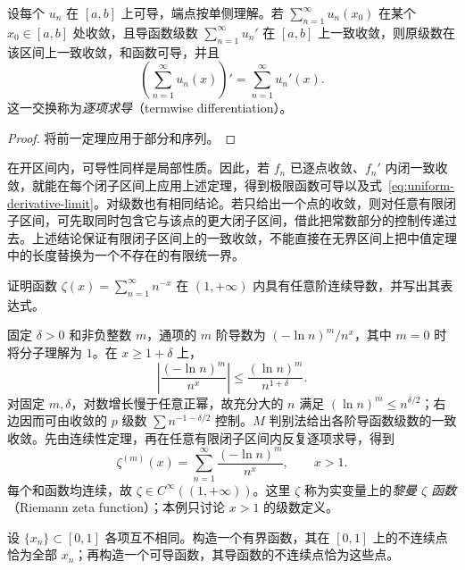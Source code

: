 \documentclass[UTF8,12pt,a4paper,fontset=fandol]{ctexbook}
\begin{document}
\begin{corollary}[逐项求导]
\label{cor:termwise-differentiation-uniform-derivative-series}
设每个 $u_n$ 在 $[a,b]$ 上可导，端点按单侧理解。若 $\sum_{n=1}^\infty u_n(x_0)$ 在某个 $x_0\in[a,b]$ 处收敛，且导函数级数 $\sum_{n=1}^\infty u_n'$ 在 $[a,b]$ 上一致收敛，则原级数在该区间上一致收敛，和函数可导，并且
\begin{equation}
    \left(\sum_{n=1}^\infty u_n(x)\right)'
       =\sum_{n=1}^\infty u_n'(x).
    \label{eq:termwise-differentiation-function-series}
\end{equation}
这一交换称为\emph{逐项求导}（termwise differentiation）。
\end{corollary}

\begin{proof}
将前一定理应用于部分和序列。
\end{proof}

在开区间内，可导性同样是局部性质。因此，若 $f_n$ 已逐点收敛、$f_n'$ 内闭一致收敛，就能在每个闭子区间上应用上述定理，得到极限函数可导以及式~\eqref{eq:uniform-derivative-limit}。对级数也有相同结论。若只给出一个点的收敛，则对任意有限闭子区间，可先取同时包含它与该点的更大闭子区间，借此把常数部分的控制传递过去。上述结论保证有限闭子区间上的一致收敛，不能直接在无界区间上把中值定理中的长度替换为一个不存在的有限统一界。

\begin{example}
\label{ex:zeta-function-smoothness-by-series}
证明函数 $\displaystyle\zeta(x)=\sum_{n=1}^\infty n^{-x}$ 在 $(1,+\infty)$ 内具有任意阶连续导数，并写出其表达式。
\end{example}

\begin{solve}
固定 $\delta>0$ 和非负整数 $m$，通项的 $m$ 阶导数为 $(-\ln n)^m/n^x$，其中 $m=0$ 时将分子理解为 $1$。在 $x\geq1+\delta$ 上，
\[
    \left|\frac{(-\ln n)^m}{n^x}\right|
    \leq\frac{(\ln n)^m}{n^{1+\delta}}.
\]
对固定 $m,\delta$，对数增长慢于任意正幂，故充分大的 $n$ 满足 $(\ln n)^m\leq n^{\delta/2}$；右边因而可由收敛的 $p$ 级数 $\sum n^{-1-\delta/2}$ 控制。$M$ 判别法给出各阶导函数级数的一致收敛。先由连续性定理，再在任意有限闭子区间内反复逐项求导，得到
\[
    \zeta^{(m)}(x)=\sum_{n=1}^\infty\frac{(-\ln n)^m}{n^x},
    \qquad x>1.
\]
每个和函数均连续，故 $\zeta\in C^\infty((1,+\infty))$。这里 $\zeta$ 称为实变量上的\emph{黎曼 $\zeta$ 函数}（Riemann zeta function）；本例只讨论 $x>1$ 的级数定义。
\end{solve}

\begin{example}
\label{ex:series-with-prescribed-discontinuity-set}
设 $\{x_n\}\subset[0,1]$ 各项互不相同。构造一个有界函数，其在 $[0,1]$ 上的不连续点恰为全部 $x_n$；再构造一个可导函数，其导函数的不连续点恰为这些点。
\end{example}
\end{document}
